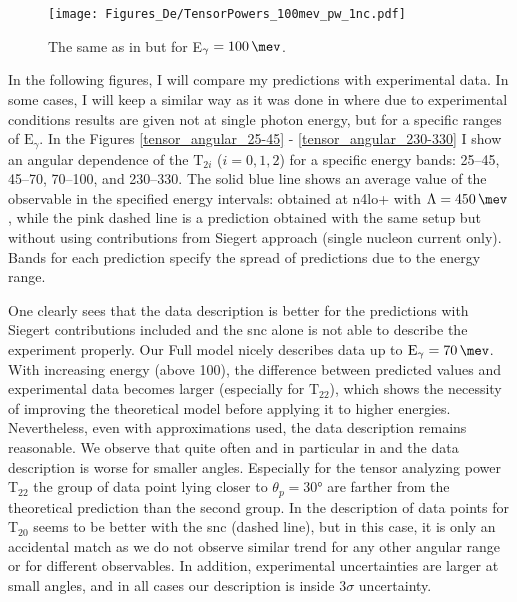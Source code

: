     \begin{figure}[h]
        \begin{center}
        \texttt{[image: Figures\_De/TensorPowers\_100mev\_pw\_1nc.pdf]}
        \end{center}
        \caption{The same as in  but for E$_\gamma=\SI{100}{\mev}$.}
        \label{tensor_pw_1nc_100mev}
    \end{figure}

    
    In the following figures, I will compare my predictions with experimental data.
    In some cases, I will keep a similar way as it was done
    in \cite{rachek2007} where due to experimental conditions results are given not at single photon energy,
    but for a specific ranges of $\text{E}_\gamma$.
    In the Figures \ref{tensor_angular_25-45} - \ref{tensor_angular_230-330}
    I show an angular dependence of the $\text{T}_{2i}$ ($i=0,1,2$) for a specific energy bands:
    \SIrange[range-phrase=--]{25}{45}{\mev}, \SIrange[range-phrase=--]{45}{70}{\mev},
    \SIrange[range-phrase=--]{70}{100}{\mev}, and \SIrange[range-phrase=--]{230}{330}{\mev}.
    The solid blue line shows an average value of the observable in the specified energy intervals:
    obtained at \gls{n4lo+} with $\Lambda=\SI{450}{\mev}$, while the pink dashed line is a prediction
    obtained with the same setup but without using contributions from Siegert approach
    (single nucleon current only). Bands for each prediction specify the spread of
    predictions due to the energy range.
    
    One clearly sees that the data description is better for the predictions with Siegert contributions included
    and the \gls{snc} alone is not able to describe the experiment properly.
    Our Full model nicely describes data up to $\text{E}_\gamma = \SI{70}{\mev}$.
    With increasing energy (above \SI{100}{\mev}),
    the difference between predicted values and experimental data becomes larger
    (especially for $\text{T}_{22}$), 
    which shows the necessity of improving the theoretical model before applying it to 
    higher energies. Nevertheless, even with approximations used,
    the data description remains reasonable. 
    We observe that quite often and in particular in  and 
    the data description is worse for smaller angles.
    Especially for the tensor analyzing power T$_{22}$
    the group of data point lying closer to $\theta_p = \ang{30}$ are farther 
    from the theoretical prediction than the second group.
    In  the description of data points for T$_{20}$ seems to be better
    with the \gls{snc} (dashed line), but in this case, it is only an accidental match as we do not observe similar 
    trend for any other angular range or for different observables.
    In addition, experimental uncertainties are larger at small angles, and in all cases 
    our description is inside 3$\sigma$ uncertainty.
    




